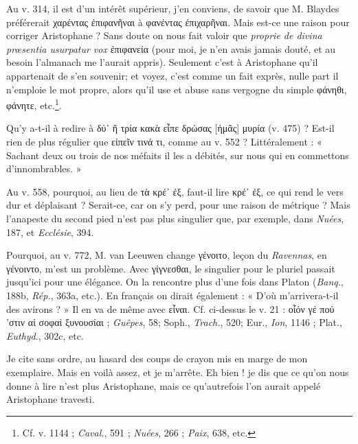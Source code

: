 \documentclass{book}%
\newcommand{\italique}[1]{\textit{#1}}%
\newcommand{\note}[1]{\footnote{#1}}
\begin{document}
Au v. 314, il est d'un intérêt supérieur, j'en conviens, de savoir que M. Blaydes préférerait χαρέντας ἐπιφανῆναι à φανέντας ἐπιχαρῆναι. 
Mais est-ce une raison pour corriger Aristophane ? Sans doute on nous fait valoir que \italique{proprie de divina prœsentia usurpatur vox} ἐπιφανεία (pour moi, je n'en avais jamais douté, et au besoin l'almanach me l'aurait appris). 
Seulement c'est à Aristophane qu'il appartenait de s'en souvenir; et voyez, c'est comme un fait exprès, nulle part il n'emploie le mot propre, alors qu'il use et abuse sans vergogne du simple φάνηθι, φάνητε, etc.\note{Cf. v. 1144 ; \italique{Caval.}, 591 ; \italique{Nuées}, 266 ; \italique{Paix}, 638, etc.}. 

Qu'y a-t-il à redire à δύ᾽ ἢ τρία κακὰ εἶπε δρώσας [ἡμᾶς] μυρία (v. 475) ? Est-il rien de plus régulier que εἰπεῖν τινά τι, comme au v. 552 ? Littéralement : « Sachant deux ou trois de nos méfaits il les a débités, sur nous qui en commettons d'innombrables. » 

Au v. 558, pourquoi, au lieu de τὰ κρέ᾽ ἐξ, faut-il lire κρέ᾽ ἐξ, ce qui rend le vers dur et déplaisant ? Serait-ce, car on s'y perd, pour une raison de métrique ?
Mais l'anapeste du second pied n'est pas plus singulier que, par exemple, dans \italique{Nuées}, 187, et \italique{Ecclésie}, 394. 

Pourquoi, au v. 772, M. van Leeuwen change γένοιτο, leçon du \italique{Ravennas}, en γένοιντο, m'est un problème. 
Avec γίγνεσθαι, le singulier pour le pluriel passait jusqu'ici pour une élégance. On la rencontre plus d'une fois dans Platon (\italique{Banq.}, 188b, \italique{Rép.}, 363a, etc.). 
En français on dirait également : « D'où m'arrivera-t-il des avirons ? » Il en va de même avec εἶναι. Cf. ci-dessus le v. 21 : οἷόν γέ πού 'στιν αἱ σοφαὶ ξυνουσίαι ; \italique{Guêpes}, 58; Soph., \italique{Trach.}, 520; Eur., \italique{Ion}, 1146 ; Plat., \italique{Euthyd}., 302c, etc. 

Je cite sans ordre, au hasard des coups de crayon mis en marge de mon exemplaire. Mais en voilà assez, et je m'arrête. 
Eh bien ! je dis que ce qu'on nous donne à lire n'est plus Aristophane, mais ce qu'autrefois l'on aurait appelé Aristophane travesti. 
\end{document}
